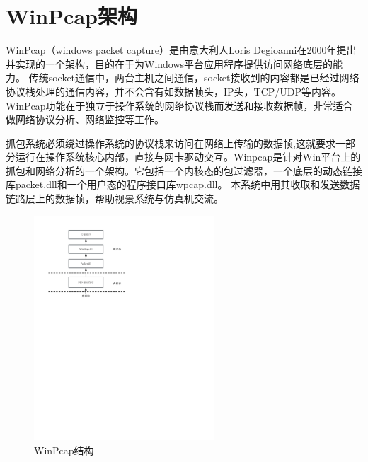 \section{WinPcap架构}
WinPcap（windows packet capture）是由意大利人Loris Degioanni在2000年提出并实现的一个架构，目的在于为Windows平台应用程序提供访问网络底层的能力\cite{winpcap1}。
传统socket通信中，两台主机之间通信，socket接收到的内容都是已经过网络协议栈处理的通信内容，并不会含有如数据帧头，IP头，TCP/UDP等内容。WinPcap功能在于独立于操作系统的网络协议栈而发送和接收数据帧，非常适合做网络协议分析、网络监控等工作\cite{winpcap2}。
\par
抓包系统必须绕过操作系统的协议栈来访问在网络上传输的数据帧,这就要求一部分运行在操作系统核心内部，直接与网卡驱动交互。Winpcap是针对Win平台上的抓包和网络分析的一个架构。它包括一个内核态的包过滤器，一个底层的动态链接库packet.dll和一个用户态的程序接口库wpcap.dll\cite{winpcap3}。
本系统中用其收取和发送数据链路层上的数据帧，帮助视景系统与仿真机交流。
\begin{figure}[h!]
    \begin{center}
        \includegraphics[width=0.6\textwidth]{pictures/winpcap.pdf}
        \caption{WinPcap结构}
        \label{wincapstruc}
    \end{center}
\end{figure}
